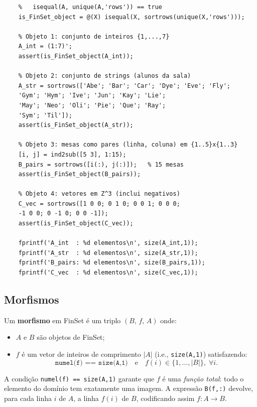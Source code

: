 \begin{lstlisting}[style=matlab, caption={Definição do invariante e exemplos de objetos em FinSet}]
	% Um objeto de FinSet e uma matriz MATLAB A tal que:
	%   isequal(A, unique(A,'rows')) == true
	is_FinSet_object = @(X) isequal(X, sortrows(unique(X,'rows')));
	
	% Objeto 1: conjunto de inteiros {1,...,7}
	A_int = (1:7)';
	assert(is_FinSet_object(A_int));
	
	% Objeto 2: conjunto de strings (alunos da sala)
	A_str = sortrows(['Abe'; 'Bar'; 'Car'; 'Dye'; 'Eve'; 'Fly';
	'Gym'; 'Hym'; 'Ive'; 'Jun'; 'Kay'; 'Lie';
	'May'; 'Neo'; 'Oli'; 'Pie'; 'Que'; 'Ray';
	'Sym'; 'Til']);
	assert(is_FinSet_object(A_str));
	
	% Objeto 3: mesas como pares (linha, coluna) em {1..5}x{1..3}
	[i, j] = ind2sub([5 3], 1:15);
	B_pairs = sortrows([i(:), j(:)]);   % 15 mesas
	assert(is_FinSet_object(B_pairs));
	
	% Objeto 4: vetores em Z^3 (inclui negativos)
	C_vec = sortrows([1 0 0; 0 1 0; 0 0 1; 0 0 0;
	-1 0 0; 0 -1 0; 0 0 -1]);
	assert(is_FinSet_object(C_vec));
	
	fprintf('A_int  : %d elementos\n', size(A_int,1));
	fprintf('A_str  : %d elementos\n', size(A_str,1));
	fprintf('B_pairs: %d elementos\n', size(B_pairs,1));
	fprintf('C_vec  : %d elementos\n', size(C_vec,1));
\end{lstlisting}

\subsection{Morfismos}

\begin{definition}
	Um \textbf{morfismo} em FinSet é um triplo $(B,\, f,\, A)$ onde:
	\begin{itemize}
		\item $A$ e $B$ são objetos de FinSet;
		\item $f$ é um vetor de inteiros de comprimento $|A|$
		(i.e., \texttt{size(A,1)}) satisfazendo:
		\begin{equation}
			\texttt{numel(f) == size(A,1)}
			\quad\text{e}\quad
			f(i) \in \{1, \ldots, |B|\},\;\forall i.
			\label{eq:finset_morph}
		\end{equation}
	\end{itemize}
	A condição \texttt{numel(f) == size(A,1)} garante que $f$ é uma
	\emph{função total}: todo o elemento do domínio tem exatamente
	uma imagem. A expressão \texttt{B(f,:)} devolve, para cada linha
	$i$ de $A$, a linha $f(i)$ de $B$, codificando assim $f: A \to B$.
\end{definition}

